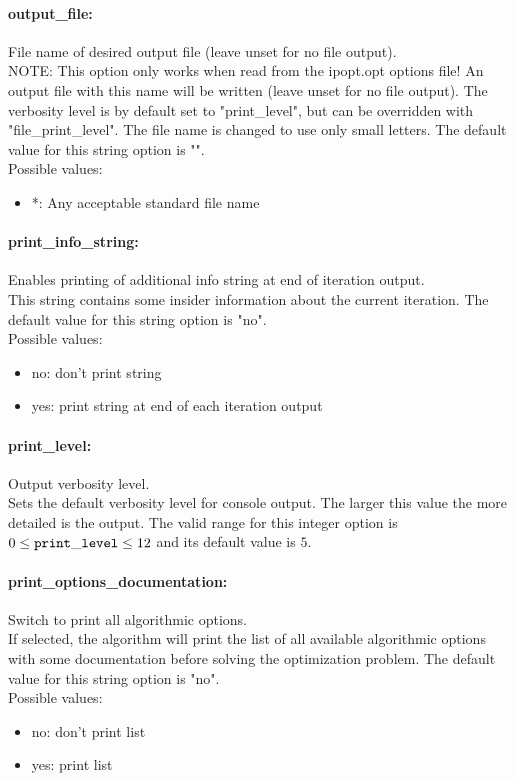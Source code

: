 \paragraph{output\_file:}\label{sec:output_file} File name of desired output file (leave unset for no file output). $\;$ \\
 NOTE: This option only works when read from the
ipopt.opt options file! An output file with this
name will be written (leave unset for no file
output).  The verbosity level is by default set
to "print\_level", but can be overridden with
"file\_print\_level".  The file name is changed
to use only small letters.
The default value for this string option is "".
\\ 
Possible values:
\begin{itemize}
   \item *: Any acceptable standard file name
\end{itemize}

\paragraph{print\_info\_string:}\label{sec:print_info_string} Enables printing of additional info string at end of iteration output. $\;$ \\
 This string contains some insider information
about the current iteration.
The default value for this string option is "no".
\\ 
Possible values:
\begin{itemize}
   \item no: don't print string
   \item yes: print string at end of each iteration output
\end{itemize}

\paragraph{print\_level:}\label{sec:print_level} Output verbosity level. $\;$ \\
 Sets the default verbosity level for console
output. The larger this value the more detailed
is the output. The valid range for this integer option is
$0 \le {\tt print\_level } \le 12$
and its default value is $5$.


\paragraph{print\_options\_documentation:}\label{sec:print_options_documentation} Switch to print all algorithmic options. $\;$ \\
 If selected, the algorithm will print the list of
all available algorithmic options with some
documentation before solving the optimization
problem.
The default value for this string option is "no".
\\ 
Possible values:
\begin{itemize}
   \item no: don't print list
   \item yes: print list
\end{itemize}

